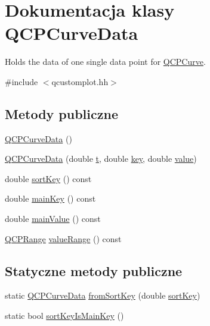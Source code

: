 \hypertarget{class_q_c_p_curve_data}{}\section{Dokumentacja klasy Q\+C\+P\+Curve\+Data}
\label{class_q_c_p_curve_data}


Holds the data of one single data point for \hyperlink{class_q_c_p_curve}{Q\+C\+P\+Curve}.  




{\ttfamily \#include $<$qcustomplot.\+hh$>$}

\subsection*{Metody publiczne}
\begin{DoxyCompactItemize}
\item 
\hyperlink{class_q_c_p_curve_data_a48252779b5198a509d99c69ae223fbf8}{Q\+C\+P\+Curve\+Data} ()
\item 
\hyperlink{class_q_c_p_curve_data_a3586be0cc6f8db15bcdd0c0d03b0c173}{Q\+C\+P\+Curve\+Data} (double \hyperlink{class_q_c_p_curve_data_aecc395525be28e9178a088793beb3ff3}{t}, double \hyperlink{class_q_c_p_curve_data_a8a4ec5f2b9a396149fd842e309701bd4}{key}, double \hyperlink{class_q_c_p_curve_data_a72b39b8e1dbf7b45382ebd48419b6828}{value})
\item 
double \hyperlink{class_q_c_p_curve_data_a5a464c57c73904310db53fa3c6ff8361}{sort\+Key} () const 
\item 
double \hyperlink{class_q_c_p_curve_data_a77c24dcafb39e50396f0b1be34c78edc}{main\+Key} () const 
\item 
double \hyperlink{class_q_c_p_curve_data_ab2e58a5711ff91a48c9a722fa42fe60b}{main\+Value} () const 
\item 
\hyperlink{class_q_c_p_range}{Q\+C\+P\+Range} \hyperlink{class_q_c_p_curve_data_a50b97325b0edd13f6cff590ede62eb3c}{value\+Range} () const 
\end{DoxyCompactItemize}
\subsection*{Statyczne metody publiczne}
\begin{DoxyCompactItemize}
\item 
static \hyperlink{class_q_c_p_curve_data}{Q\+C\+P\+Curve\+Data} \hyperlink{class_q_c_p_curve_data_a40adf1a6ba93051c415a65298b49aa6e}{from\+Sort\+Key} (double \hyperlink{class_q_c_p_curve_data_a5a464c57c73904310db53fa3c6ff8361}{sort\+Key})
\item 
static bool \hyperlink{class_q_c_p_curve_data_a1b78f228e31ca40a1e69add44537918c}{sort\+Key\+Is\+Main\+Key} ()
\end{DoxyCompactItemize}

